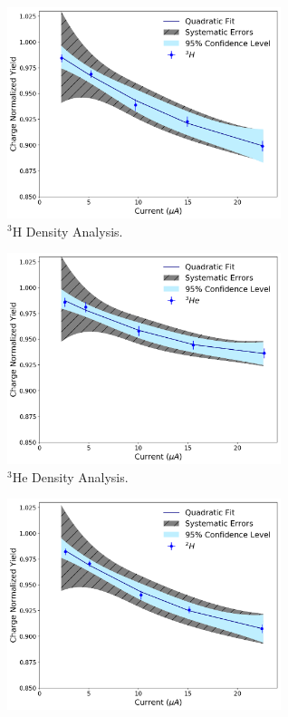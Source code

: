\documentclass[final,5p,times,twocolumn]{elsarticle}
\begin{document}
\begin{figure}[h]
\begin{center}
  \begin{subfigure}{8cm}
    \centering\includegraphics[width=8cm]{images/tritium_data.pdf}
    \caption{$^{3}$H Density Analysis. }
    \label{fig:tritium_data}
  \end{subfigure}\vspace{0.5cm}
  \begin{subfigure}{8cm}
    \centering\includegraphics[width=8cm]{images/helium_data.pdf}
    \caption{$^{3}$He Density Analysis.}
    \label{fig:helium_data}
  \end{subfigure}\vspace{0.5cm}
  \begin{subfigure}{8cm}
    \centering\includegraphics[width=8cm]{images/deuterium_data.pdf}

\end{subfigure}
\end{center}
\end{figure}
\end{document}
